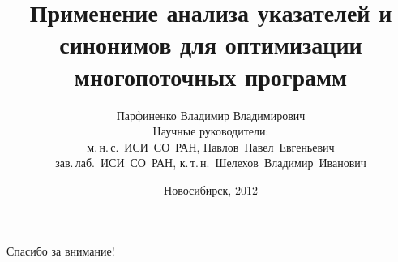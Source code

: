 \documentclass[usenames,dvipsnames,pdftex,unicode,hidelinks]{beamer}
\title[Анализ указателей и синонимов]{
  Применение анализа указателей и синонимов
  для оптимизации многопоточных программ
}
\author[Парфиненко Владимир Владимирович]{
  Парфиненко Владимир Владимирович
  \texorpdfstring{%
    \\
    \vspace{0.5cm}
    \small 
      Научные руководители:\\
      м.\,н.\,с.~ИСИ~СО~РАН, Павлов~Павел~Евгеньевич \\
      зав.\,лаб.~ИСИ~СО~РАН, к.\,т.\,н.~Шелехов~Владимир~Иванович
  }{}%
}
\institute{
  Новосибирский Национальный Исследовательский \\
  Государственный Университет
}
\date{
  Новосибирск, 2012\ifdraft{ \\\medskip \footnotesize Git date: \GitDate.}{}
}
\begin{document}
\begin{frame}
  \titlepage
\end{frame}

\begin{frame}

  \centering\huge

  Спасибо за внимание!

\end{frame}
\end{document}
